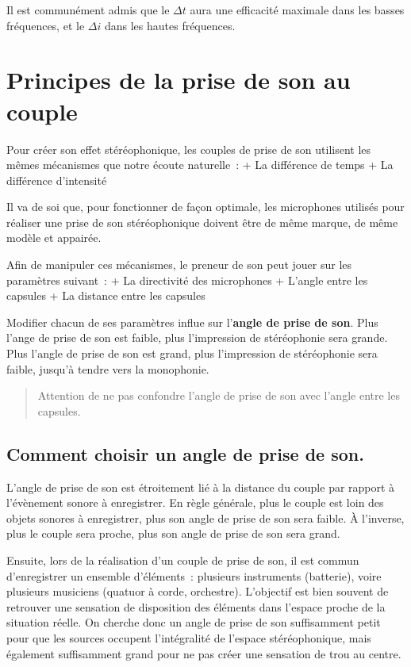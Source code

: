 \documentclass[
]{book}
\begin{document}
Il est communément admis que le \(\Delta t\) aura une efficacité maximale dans les basses fréquences, et le \(\Delta i\) dans les hautes fréquences.

\hypertarget{principes-de-la-prise-de-son-au-couple}{%
\section{Principes de la prise de son au couple}\label{principes-de-la-prise-de-son-au-couple}}

Pour créer son effet stéréophonique, les couples de prise de son utilisent les mêmes mécanismes que notre écoute naturelle~:
+ La différence de temps
+ La différence d'intensité

Il va de soi que, pour fonctionner de façon optimale, les microphones utilisés pour réaliser une prise de son stéréophonique doivent être de même marque, de même modèle et appairée.

Afin de manipuler ces mécanismes, le preneur de son peut jouer sur les paramètres suivant~:
+ La directivité des microphones
+ L'angle entre les capsules
+ La distance entre les capsules

Modifier chacun de ses paramètres influe sur l'\textbf{angle de prise de son}. Plus l'ange de prise de son est faible, plus l'impression de stéréophonie sera grande. Plus l'angle de prise de son est grand, plus l'impression de stéréophonie sera faible, jusqu'à tendre vers la monophonie.

\begin{quote}
Attention de ne pas confondre l'angle de prise de son avec l'angle entre les capsules.
\end{quote}

\hypertarget{comment-choisir-un-angle-de-prise-de-son.}{%
\subsection{Comment choisir un angle de prise de son.}\label{comment-choisir-un-angle-de-prise-de-son.}}

L'angle de prise de son est étroitement lié à la distance du couple par rapport à l'évènement sonore à enregistrer. En règle générale, plus le couple est loin des objets sonores à enregistrer, plus son angle de prise de son sera faible. À l'inverse, plus le couple sera proche, plus son angle de prise de son sera grand.

Ensuite, lors de la réalisation d'un couple de prise de son, il est commun d'enregistrer un ensemble d'éléments~: plusieurs instruments (batterie), voire plusieurs musiciens (quatuor à corde, orchestre). L'objectif est bien souvent de retrouver une sensation de disposition des éléments dans l'espace proche de la situation réelle. On cherche donc un angle de prise de son suffisamment petit pour que les sources occupent l'intégralité de l'espace stéréophonique, mais également suffisamment grand pour ne pas créer une sensation de trou au centre.
\end{document}
